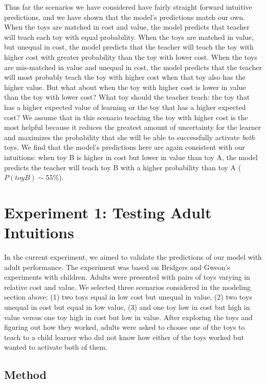 \documentclass[10pt,letterpaper]{article}
\begin{document}
Thus far the scenarios we have considered have fairly straight forward intuitive predictions, and we have shown that the model's predictions match our own. When the toys are matched in cost and value, the model predicts that teacher will teach each toy with equal probability. When the toys are matched in value, but unequal in cost, the model predicts that the teacher will teach the toy with higher cost with greater probability than the toy with lower cost. When the toys are mis-matched in value and unequal in cost, the model predicts that the teacher will most probably teach the toy with higher cost when that toy also has the higher value. But what about when the toy with higher cost is lower in value than the toy with lower cost? What toy should the teacher teach: the toy that has a higher expected value of learning or the toy that has a higher expected cost? We assume that in this scenario teaching the toy with higher cost is the most helpful because it reduces the greatest amount of uncertainty for the learner and maximizes the probability that she will be able to successfully activate \textit{both} toys. We find that the model's predictions here are again consistent with our intuitions: when toy B is higher in cost but lower in value than toy A, the model predicts the teacher will teach toy B with a higher probability than toy A ($P(toyB) \sim 55\%$).

\section{Experiment 1: Testing Adult Intuitions}

In the current experiment, we aimed to validate the predictions of our model with adult performance. The experiment was based on Bridgers and Gweon's experiments with children. Adults were presented with pairs of toys varying in relative cost and value. We selected three scenarios considered in the modeling section above: (1) two toys equal in low cost but unequal in value, (2) two toys unequal in cost but equal in low value, (3) and one toy low in cost but high in value versus one toy high in cost but low in value. After exploring the toys and figuring out how they worked, adults were asked to choose one of the toys to teach to a child learner who did not know how either of the toys worked but wanted to activate both of them. 

\subsection{Method}
\end{document}
